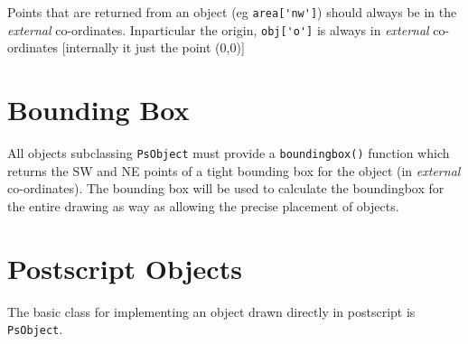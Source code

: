 \documentclass[a4paper]{book}
\begin{document}
Points that are returned from an object (eg \Verb|area['nw']|) should
always be in the \emph{external} co-ordinates. Inparticular the origin,
\Verb|obj['o']| is always in \emph{external} co-ordinates [internally it
just the point (0,0)]

\section{Bounding Box}
\label{sec:bounding-box}

All objects subclassing \Verb|PsObject| must provide a \Verb|boundingbox()|
function which returns the SW and NE points of a tight bounding box for the
object (in \emph{external} co-ordinates). The bounding box will be used
to calculate the boundingbox for the entire drawing as way as allowing
the precise placement of objects.


\section{Postscript Objects}
\label{sec:postscript-objects}

The basic class for implementing an object drawn directly in postscript
is \Verb|PsObject|. 

\appendix




\end{document}
